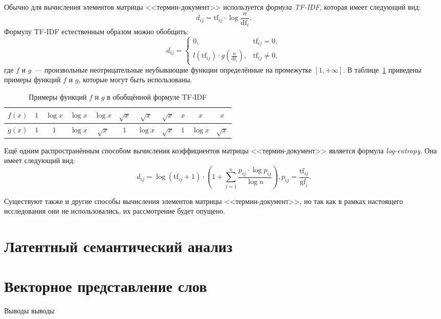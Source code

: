 Обычно для вычисления элементов матрицы <<термин-документ>> используется
\textit{формула TF-IDF}, которая имеет следующий вид:
\begin{equation}\label{eq:tf_idf}
    d_{ij} = \mathrm{tf}_{ij} \cdot \log{\frac{n}{\mathrm{df}_{i}}}.
\end{equation}
Формулу TF-IDF естественным образом можно обобщить:
\begin{equation}\label{eq:general_tfidf}
d_{ij} = \begin{cases}
    0,& \mathrm{tf}_{ij} = 0,\\
    l(\mathrm{tf}_{ij}) \cdot g(\frac{n}{\mathrm{df}_{i}}),& \mathrm{tf}_{ij} \ne 0,
         \end{cases}
\end{equation}
где $f$ и $g$~--- произвольные неотрицательные неубывающие функции определённые
на промежутке $\left[1, +\infty \right]$. В
таблице~\ref{tab:f_g_examples} приведены примеры функций $f$ и $g$,
которые могут быть использованы.

\begin{table}[!h]
    \caption{Примеры функций $f$ и $g$ в обобщённой формуле TF-IDF}\label{tab:f_g_examples}
\centering
\begin{tabular}{|c|c|c|c|c|c|c|c|c|c|c|}\hline
    \boldmath$f(x)$ & $1$ & $\log{x}$ & $\log{x}$ & $\log{x}$ & $\sqrt{x}$ & $\sqrt{x}$ & $\sqrt{x}$ & $x$ & $x$ & $x$ \\\hline
    \boldmath$g(x)$ & $1$ & $1$ & $\log{x}$ & $\sqrt{x}$ & $1$ & $\log{x}$ & $\sqrt{x}$ & $1$ & $\log{x}$ & $\sqrt{x}$ \\\hline
\end{tabular}
\end{table}

Ещё одним распространённым способом вычисления коэффициентов
матрицы <<термин-документ>> является формула \textit{log-entropy}.
Она имеет следующий вид:
\begin{equation}\label{eq:log_entropy}
    d_{ij} = \log{(\mathrm{tf}_{ij} + 1)} \cdot
    (1 + \sum_{j=1}^{n} \frac{p_{ij} \cdot \log{p_{ij}}}{\log{n}}),
    p_{ij} = \frac{\mathrm{tf}_{ij}}{\mathrm{gf}_i}.
\end{equation}

Существуют также и другие способы вычисления элементов
матрицы <<термин-документ>>, но так как в рамках настоящего исследования
они не использовались, их рассмотрение будет опущено.

\section{Латентный семантический анализ}
\label{sec:latent_semantic_analysis}

\section{Векторное представление слов}
\label{sec:word_embedding}

\chapterconclusion

Выводы выводы
